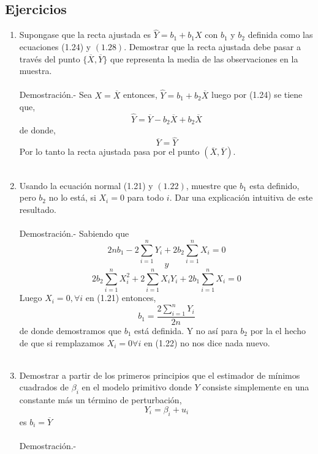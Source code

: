 \begin{multicols}{2}
\section{Ejercicios}
\begin{enumerate}[\bfseries 1.1]

    \item Supongase que la recta ajustada es $\hat{Y}=b_1+b_1X$ con $b_1$ y $b_2$ definida como las ecuaciones (1.24) y $(1.28)$. Demostrar que la recta ajustada debe pasar a través del punto $\lbrace\overline{X},\overline{Y}\rbrace$ que representa la media de las observaciones en la muestra.\\\\
	Demostración.-\; Sea $X=\overline{X}$ entonces, $\hat{Y} = b_1 + b_2\overline{X}$ luego por (1.24) se tiene que,
	$$\hat{Y} = \overline{Y} - b_2\overline{X} + b_2\overline{X}$$
	de donde,
	$$\overline{Y} = \hat{Y}$$
	Por lo tanto la recta ajustada pasa por el punto $(\overline{X},\overline{Y})$.\\\\

    \item Usando la ecuación normal (1.21) y $(1.22)$, muestre que $b_1$ esta definido, pero $b_2$ no lo está, si $X_i = 0$ para todo $i$. Dar una explicación intuitiva de este resultado.\\\\
	Demostración.-\; Sabiendo que 
	$$2nb_1 - 2\sum\limits_{i=1}^n Y_i + 2b_2\sum\limits_{i=1}^n X_i = 0$$
	$$y$$
	$$2b_2\sum\limits_{i=1}^n X_i^2 + 2\sum\limits_{i=1}^n X_iY_i + 2b_1\sum\limits_{i=1}^n X_i = 0$$
	Luego $X_i = 0, \forall i$  en (1.21) entonces,
	$$b_1 = \dfrac{2\sum\limits_{i=1}^n Y_i}{2n}$$
	de donde demostramos que $b_1$ está definida. Y no así para $b_2$ por la el hecho de que si remplazamos $X_i=0 \forall i$ en (1.22) no nos dice nada nuevo.\\\\

    \item Demostrar a partir de los primeros principios que el estimador de mínimos cuadrados de $\beta_i$ en el modelo primitivo donde $Y$ consiste simplemente en una constante más un término de perturbación,
	$$Y_i = \beta_i + u_i$$
	es $b_i = \overline{Y}$\\\\
	Demostración.-\; 
 

\end{enumerate}

\end{multicols}
